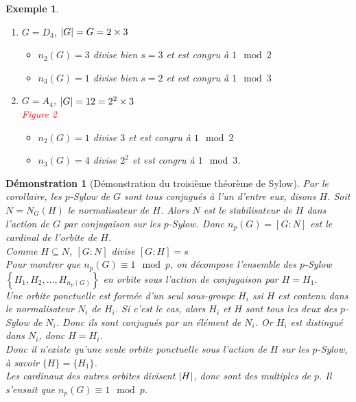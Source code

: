\documentclass[a4paper, oneside]{report}
\theoremstyle{break}
\newtheorem{exemple}[thm]{Exemple}
\newtheorem*{demonstration}{Démonstration}
\newcommand{\red}[1]{\textcolor{red}{#1}}
\DeclarePairedDelimiter\ens{\left\{ }{\right\} }%
\DeclarePairedDelimiter\abs{\lvert}{\rvert}%
\renewcommand{\ens}[1]{\left\{ #1 \right\} }%
\begin{document}
\begin{exemple}
\begin{enumerate}
\item $G = D_3$, $\abs{G} = G = 2 \times 3$
\begin{itemize}
\item $n_2(G) = 3$ divise bien $s = 3$ et est congru à $1 \mod 2$

\item $n_3(G) = 1$ divise bien $s = 2$ et est congru à $1 \mod 3$
\end{itemize}

\medbreak

\item $G = A_4$, $\abs{G} = 12 = 2^2 \times 3$\\
\red{Figure 2}
\begin{itemize}
\item $n_2(G) = 1$ divise $3$ et est congru à $1 \mod 2$

\item $n_3(G) = 4$ divise $2^2$ et est congru à $1 \mod 3$.
\end{itemize}
\end{enumerate}
\end{exemple}

\begin{demonstration}[Démonstration du troisième théorème de Sylow]
Par le corollaire, les $p$-Sylow de $G$ sont tous conjugués à l'un d'entre eux, disons $H$. Soit $N = N_G(H)$ le normalisateur de $H$. Alors $N$ est le stabilisateur de $H$ dans l'action de $G$ par conjugaison sur les $p$-Sylow. Donc $n_p(G) = [G:N]$ est le cardinal de l'orbite de $H$.\\
Comme $H \subseteq N$, $[G:N]$ divise $[G:H] = s$\\
Pour montrer que $n_p(G) \equiv 1 \mod p$, on décompose l'ensemble des $p$-Sylow $\ens{H_1, H_2, \ldots, H_{n_p(G)}}$ en orbite sous l'action de conjugaison par $H = H_1$.\\
Une orbite ponctuelle est formée d'un seul sous-groupe $H_i$ ssi $H$ est contenu dans le normalisateur  $N_i$ de $H_i$. Si c'est le cas, alors $H_i$ et $H$ sont tous les deux des $p$-Sylow de $N_i$. Donc ils sont conjugués par un élément de $N_i$. Or $H_i$ est distingué dans $N_i$, donc $H = H_i$.\\
Donc il n'existe qu'une seule orbite ponctuelle sous l'action de $H$ sur les $p$-Sylow, à savoir $\{H\} = \{H_1\}$.\\
Les cardinaux des autres orbites divisent $\abs{H}$, donc sont des multiples de $p$. Il s'ensuit que $n_p(G) \equiv 1 \mod p$.
\end{demonstration}
\end{document}
